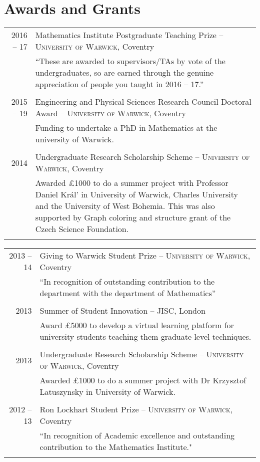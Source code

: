 \documentclass[a4paper,10pt]{article}
\begin{document}
\section{Awards and Grants}
\begin{tabular}{r|p{16cm}}
\textsc{2016 -- 17}& Mathematics Institute Postgraduate Teaching Prize -- \textsc{University of Warwick}, Coventry\\&\footnotesize{``These are awarded to supervisors/TAs by vote of the undergraduates, so are earned through the genuine appreciation of people you taught in 2016 -- 17.”}\\\multicolumn{2}{c}{} \\
\textsc{2015 -- 19}& Engineering and Physical Sciences Research Council Doctoral Award -- \textsc{University of Warwick}, Coventry\\&\footnotesize{Funding to undertake a PhD in Mathematics at the university of Warwick.}\\\multicolumn{2}{c}{} \\
\textsc{2014}& Undergraduate Research Scholarship Scheme -- \textsc{University of Warwick}, Coventry\\&\footnotesize{Awarded £1000 to do a summer project with Professor Daniel Král' in University of Warwick, Charles University and the University of West Bohemia. This was also supported by Graph coloring and structure grant of the Czech Science Foundation.}\\\multicolumn{2}{c}{} \\
\end{tabular}


\begin{tabular}{r|p{16.2cm}}
\textsc{2013 -- 14}& Giving to Warwick Student Prize -- \textsc{University of Warwick}, Coventry\\&\footnotesize{``In recognition of outstanding contribution to the department with the department of Mathematics”}\\\multicolumn{2}{c}{} \\
\textsc{2013}& Summer of Student Innovation -- \textsc{JISC}, London\\&\footnotesize{Award £5000 to develop a virtual learning platform for university students teaching them graduate level techniques.}\\\multicolumn{2}{c}{} \\
\textsc{2013} & Undergraduate Research Scholarship Scheme -- \textsc{University of Warwick}, Coventry\\&\footnotesize{Awarded £1000 to do a summer project with Dr Krzysztof Latuszynsky in University of Warwick.}\\\multicolumn{2}{c}{} \\
\textsc{2012 -- 13}& Ron Lockhart Student Prize -- \textsc{University of Warwick}, Coventry\\&\footnotesize{``In recognition of Academic excellence and outstanding contribution to the Mathematics Institute."}\\\multicolumn{2}{c}{} \\
\end{tabular}
\end{document}

